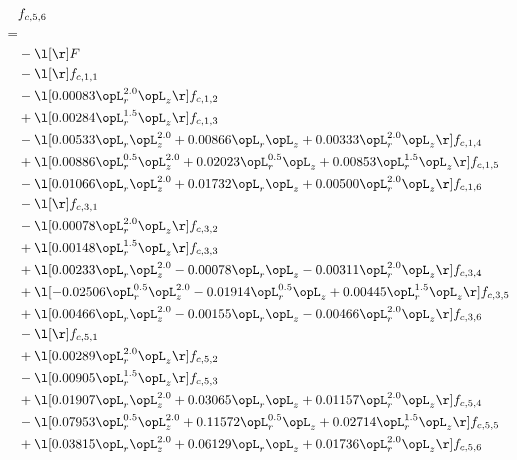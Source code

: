 \begin{alignat}{2} 
\label{eq:f_56_1} 
& f_{c,5,6} \nonumber \\ 
 = \\ 
& - \l[  \r] F \nonumber \\ 
& - \l[  \r] f_{c,1,1} \nonumber \\ 
& - \l[  0.00083 \opL_r^{2.0} \opL_z  \r] f_{c,1,2} \nonumber \\ 
& + \l[  0.00284 \opL_r^{1.5} \opL_z  \r] f_{c,1,3} \nonumber \\ 
& - \l[  0.00533 \opL_r \opL_z^{2.0} +  0.00866 \opL_r \opL_z +  0.00333 \opL_r^{2.0} \opL_z  \r] f_{c,1,4} \nonumber \\ 
& + \l[  0.00886 \opL_r^{0.5} \opL_z^{2.0} +  0.02023 \opL_r^{0.5} \opL_z +  0.00853 \opL_r^{1.5} \opL_z  \r] f_{c,1,5} \nonumber \\ 
& - \l[  0.01066 \opL_r \opL_z^{2.0} +  0.01732 \opL_r \opL_z +  0.00500 \opL_r^{2.0} \opL_z  \r] f_{c,1,6} \nonumber \\ 
& - \l[  \r] f_{c,3,1} \nonumber \\ 
& - \l[  0.00078 \opL_r^{2.0} \opL_z  \r] f_{c,3,2} \nonumber \\ 
& + \l[  0.00148 \opL_r^{1.5} \opL_z  \r] f_{c,3,3} \nonumber \\ 
& + \l[  0.00233 \opL_r \opL_z^{2.0}   -0.00078 \opL_r \opL_z   -0.00311 \opL_r^{2.0} \opL_z  \r] f_{c,3,4} \nonumber \\ 
& + \l[  -0.02506 \opL_r^{0.5} \opL_z^{2.0}   -0.01914 \opL_r^{0.5} \opL_z +  0.00445 \opL_r^{1.5} \opL_z  \r] f_{c,3,5} \nonumber \\ 
& + \l[  0.00466 \opL_r \opL_z^{2.0}   -0.00155 \opL_r \opL_z   -0.00466 \opL_r^{2.0} \opL_z  \r] f_{c,3,6} \nonumber \\ 
& - \l[  \r] f_{c,5,1} \nonumber \\ 
& + \l[  0.00289 \opL_r^{2.0} \opL_z  \r] f_{c,5,2} \nonumber \\ 
& - \l[  0.00905 \opL_r^{1.5} \opL_z  \r] f_{c,5,3} \nonumber \\ 
& + \l[  0.01907 \opL_r \opL_z^{2.0} +  0.03065 \opL_r \opL_z +  0.01157 \opL_r^{2.0} \opL_z  \r] f_{c,5,4} \nonumber \\ 
& - \l[  0.07953 \opL_r^{0.5} \opL_z^{2.0} +  0.11572 \opL_r^{0.5} \opL_z +  0.02714 \opL_r^{1.5} \opL_z  \r] f_{c,5,5} \nonumber \\ 
& + \l[  0.03815 \opL_r \opL_z^{2.0} +  0.06129 \opL_r \opL_z +  0.01736 \opL_r^{2.0} \opL_z  \r] f_{c,5,6} \nonumber \\ 

\end{alignat}
